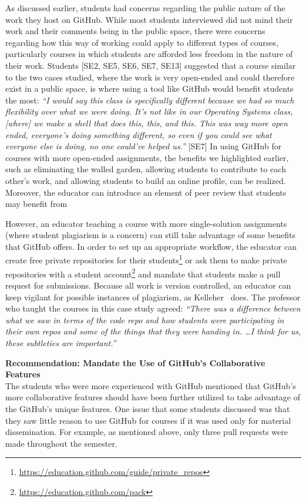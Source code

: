 As discussed earlier, students had concerns regarding the public nature of the work they host on GitHub. While most students interviewed did not mind their work and their comments being in the public space, there were concerns regarding how this way of working could apply to different types of courses, particularly courses in which students are afforded less freedom in the nature of their work. Students [SE2, SE5, SE6, SE7, SE13] suggested that a course similar to the two cases studied, where the work is very open-ended and could therefore exist in a public space, is where using a tool like GitHub would benefit students the most: \textit{``I would say this class is specifically different because we had so much flexibility over what we were doing. It's not like in our Operating Systems class, [where] we make a shell that does this, this, and this. This was way more open ended, everyone's doing something different, so even if you could see what everyone else is doing, no one could've helped us.''} [SE7] In using GitHub for courses with more open-ended assignments, the benefits we highlighted earlier, such as eliminating the walled garden, allowing students to contribute to each other's work, and allowing students to build an online profile, can be realized. Moreover, the educator can introduce an element of peer review that students may benefit from \cite{sondergaard2012collaborative}

However, an educator teaching a course with more single-solution assignments (where student plagiarism is a concern) can still take advantage of some benefits that GitHub offers. In order to set up an appropriate workflow, the educator can create free private repositories for their students\footnote{\url{https://education.github.com/guide/private_repos}} or ask them to make private repositories with a student account\footnote{\url{https://education.github.com/pack}} and mandate that students make a pull request for submissions. Because all work is version controlled, an educator can keep vigilant for possible instances of plagiarism, as Kelleher~\cite{kelleher2014employing} does. The professor who taught the courses in this case study agreed: \textit{``There was a difference between what we saw in terms of the code repo and how students were participating in their own repos and some of the things that they were handing in. \ldots I think for us, these subtleties are important.''}

\textbf{Recommendation: Mandate the Use of GitHub's Collaborative Features} \\
The students who were more experienced with GitHub mentioned that GitHub's more collaborative features should have been further utilized to take advantage of the GitHub's unique features. One issue that some students discussed was that they saw little reason to use GitHub for courses if it was used only for material dissemination. For example, as mentioned above, only three pull requests were made throughout the semester.

